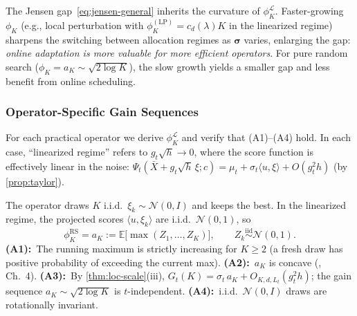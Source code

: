\begin{remark}
\label{rmk:jensen-curvature}
The Jensen gap~\eqref{eq:jensen-general} inherits the curvature of
$\phi_K^{\mathcal{L}}$.
Faster-growing $\phi_K$ (e.g., local perturbation with
$\phi_K^{(\mathrm{LP})}=c_d(\lambda)K$ in the linearized regime)
sharpens the switching between allocation regimes as
$\boldsymbol{\sigma}$ varies, enlarging the gap:
\emph{online adaptation is more valuable for more efficient
operators}.
For pure random search ($\phi_K=a_K\sim\sqrt{2\log K}$), the slow
growth yields a smaller gap and less benefit from online
scheduling.
\end{remark}

\subsubsection{Operator-Specific Gain Sequences}
\label{sec:operator-gain}

For each practical operator we derive $\phi_K^{\mathcal{L}}$ and
verify that (A1)--(A4) hold.
In each case, ``linearized regime'' refers to
$g_t\sqrt{h}\to 0$, where the score function is effectively
linear in the noise: $\Psi_t(\bar{X}+g_t\sqrt{h}\,\xi;c)
= \mu_t+\sigma_t\langle u,\xi\rangle + O(g_t^2 h)$
(by \cref{prop:taylor}).

\begin{example}
\label{ex:random-search}
The operator draws $K$ i.i.d.\ $\xi_k\sim\mathcal{N}(0,I)$
and keeps the best.
In the linearized regime, the projected scores
$\langle u,\xi_k\rangle$ are i.i.d.\ $\mathcal{N}(0,1)$, so
\begin{equation}
  \phi_K^{\mathrm{RS}} = a_K
  := \mathbb{E}\bigl[\max(Z_1,\ldots,Z_K)\bigr],
  \qquad Z_k\stackrel{\mathrm{iid}}{\sim}\mathcal{N}(0,1).
  \label{eq:phi-rs}
\end{equation}
\textbf{(A1):}~The running maximum is strictly increasing for $K\ge 2$
(a fresh draw has positive probability of exceeding the current max).
\textbf{(A2):}~$a_K$ is concave
(\citealt{david2003order}, Ch.~4).
\textbf{(A3):}~By \cref{thm:loc-scale}(iii),
$G_t(K)=\sigma_t\,a_K+O_{K,d,L_t}(g_t^2 h)$; the gain sequence
$a_K\sim\sqrt{2\log K}$ is $t$-independent.
\textbf{(A4):}~i.i.d.\ $\mathcal{N}(0,I)$ draws are
rotationally invariant.
\end{example}

